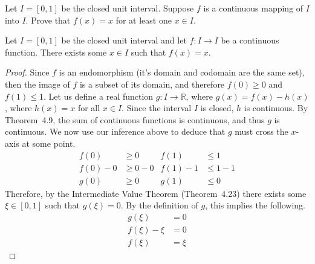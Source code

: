 \begin{exercise}
	Let $I = \left[ 0, 1 \right]$ be the closed unit interval. Suppose $f$ is a continuous mapping of $I$ into $I$. Prove that $f(x) = x$ for at least one $x \in I$.
\end{exercise}
\begin{proposition}
	Let $I = \left[ 0, 1\right]$ be the closed unit interval and let $f : I \to I$ be a continuous function. There exists some $x \in I$ such that $f(x) = x$.
\end{proposition}
\begin{proof}
	Since $f$ is an endomorphism (it's domain and codomain are the same set), then the image of $f$ is a subset of its domain, and therefore $f\left(0\right) \geq 0$ and $f\left(1\right) \leq 1$.
	\newline\newline
	Let us define a real function $g : I \to \mathbb{R}$, where $g\left(x\right) = f\left(x\right) - h\left(x\right)$, where $h\left(x\right) = x$ for all $x \in I$. Since the interval $I$ is closed, $h$ is continuous. By Theorem~4.9, the sum of continuous functions is continuous, and thus $g$ is continuous.
	\newline\newline	
	We now use our inference above to deduce that $g$ must cross the $x$-axis at some point.
	\begin{align*}
	f\left(0\right) &\geq 0 & f\left(1\right) &\leq 1 \\
	f\left(0\right) - 0 &\geq 0 - 0 & f\left(1\right) - 1 &\leq 1 - 1 \\
	g\left(0\right) &\geq 0 & g\left(1\right) &\leq 0
	\end{align*}
	Therefore, by the Intermediate Value Theorem (Theorem~4.23) there exists some $\xi \in \left[ 0, 1 \right]$ such that $g\left(\xi\right) = 0$. By the definition of $g$, this implies the following.
	\begin{align*}
	g\left(\xi\right) &= 0 \\
	f\left(\xi\right) - \xi &= 0 \\
	f\left(\xi\right) &= \xi
	\end{align*}
\end{proof}
